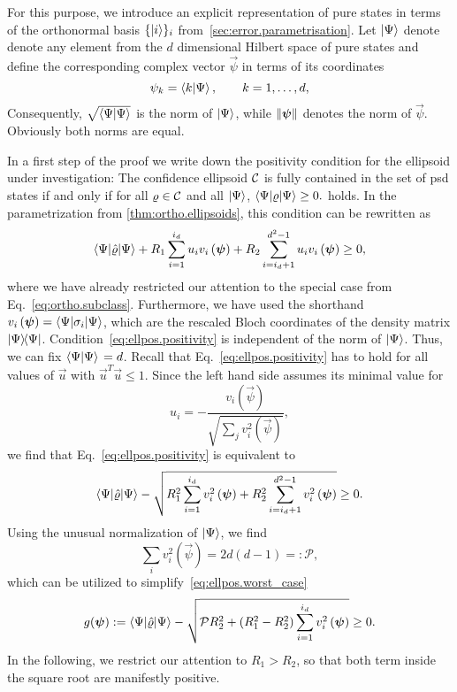 For this purpose, we introduce an explicit representation of pure states in terms of the orthonormal basis $\{\ket{i}\}_i$ from~\cref{sec:error.parametrisation}.
Let $\ket{\Psi}$ denote denote any element from the $d$ dimensional Hilbert space of pure states and define the corresponding  complex vector $\vec{\psi}$ in terms of its coordinates
\[
  \psi_{k} = \braket{k | \Psi} ,\qquad k=1,\ldots,d,\label{coordinates}
\]
Consequently, $\sqrt{\braket{\Psi | \Psi}}$ is the norm of $\ket{\Psi}$, while ${\Vert{\boldsymbol{\psi}}\Vert}$ denotes the norm of $\vec\psi$.
Obviously both norms are equal.

In a first step of the proof we write down the positivity condition for the ellipsoid under investigation:
The confidence ellipsoid $\mathcal{C}$ is fully contained in the set of psd states if and only if for all $\varrho \in \mathcal{C}$ and all $\ket{\Psi}$,
\(
  \bra{\Psi} \varrho \ket{\Psi} \ge 0.
\)
holds.
In the parametrization from \cref{thm:ortho.ellipsoids}, this condition can be rewritten as
\[
  \bra{\Psi}\estim{\varrho} \ket{\Psi} +R_{1}\sum_{i=1}^{i_{d}}u_{i}v_{i}\left(\vec\psi\right)+R_{2}\sum_{i=i_{d}+1}^{d^{2}-1}u_{i}v_{i}\left(\vec\psi\right)\geq0,
  \label{eq:ellpos.positivity}
\]
where we have already restricted our attention to the special case from Eq.~\eqref{eq:ortho.subclass}.
Furthermore, we have used the shorthand $v_{i}\left(\vec\psi\right)=\bra{\Psi}\sigma_{i} \ket{\Psi} $, which are the rescaled Bloch coordinates of the density matrix $\ket{\Psi} \bra{\Psi}$.
Condition~\eqref{eq:ellpos.positivity} is independent of the norm of $\ket{\Psi}$.
Thus, we can fix $\left\langle \Psi \ket{\Psi} \right. = d$.
Recall that Eq.~\eqref{eq:ellpos.positivity} has to hold for all values of $\vec u$ with $\vec u^T \vec u \le 1$.
Since the left hand side assumes its minimal value for
\[
  u_{i} = -\frac{v_{i}\left(\vec\psi\right)}{\sqrt{\sum_{j}v_{i}^{2}\left(\vec\psi\right)}},
\]
we find that Eq.~\eqref{eq:ellpos.positivity} is equivalent to
\[
 \bra{\Psi}\estim{\varrho} \ket{\Psi} -\sqrt{R_{1}^{2}\sum_{i=1}^{i_{d}}v_{i}^{2}\left(\vec\psi\right)+R_{2}^{2}\sum_{i=i_{d}+1}^{d^{2}-1}v_{i}^{2}\left(\vec\psi\right)}\geq0.
  \label{eq:ellpos.worst_case}
\]
Using the unusual normalization of $\ket\Psi$, we find
\[
  \sum_{i}v_{i}^{2}\left(\vec\psi\right)=2 d\left(d-1\right) =: \mathcal{P},
\]
which can be utilized to simplify~\eqref{eq:ellpos.worst_case}
\[
 g(\vec\psi) := \bra{\Psi}\estim{\varrho} \ket{\Psi} -\sqrt{\mathcal{P}R_{2}^{2}+\left(R_{1}^{2}-R_{2}^{2}\right)\sum_{i=1}^{i_{d}}v_{i}^{2}\left(\vec\psi\right)}\geq0.
  \label{eq:ellpos.major}
\]
In the following, we restrict our attention to  $R_{1}>R_{2}$, so that both term inside the square root are manifestly positive.\\
